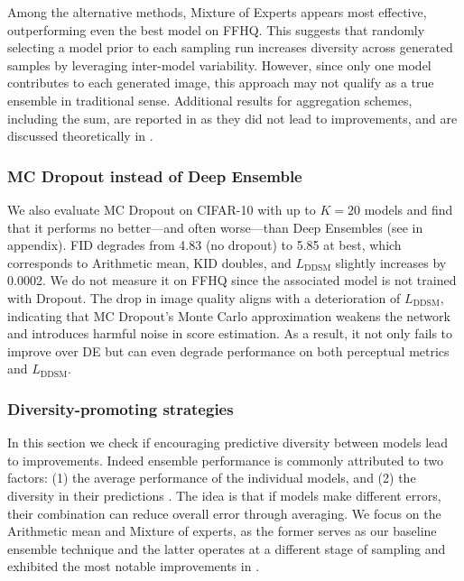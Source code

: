 \documentclass[10pt]{article} %
\newcommand{\DDSM}{\text{DDSM}}
\begin{document}
Among the alternative methods, Mixture of Experts appears most effective, outperforming even the best model on FFHQ. This suggests that randomly selecting a model prior to each sampling run increases diversity across generated samples by leveraging inter-model variability. However, since only one model contributes to each generated image, this approach may not qualify as a true ensemble in traditional sense.
Additional results for aggregation schemes, including the sum, are reported in  as they did not lead to improvements, and are discussed theoretically in  .

\subsubsection{MC Dropout instead of Deep Ensemble}\label{section: MC Dropout}

We also evaluate MC Dropout on CIFAR-10 with up to $K=20$ models and find that it performs no better—and often worse—than Deep Ensembles (see  in appendix). FID degrades from 4.83 (no dropout) to 5.85 at best, which corresponds to Arithmetic mean, KID doubles, and $L_\DDSM$ slightly increases by 0.0002. We do not measure it on FFHQ since the
associated model is not trained with Dropout. 
The drop in image quality aligns with a deterioration of $L_\DDSM$, indicating that MC Dropout’s Monte Carlo approximation weakens the network and introduces harmful noise in score estimation. As a result, it not only fails to improve over DE but can even degrade performance on both perceptual metrics and $L_\DDSM$. 




\subsubsection{Diversity-promoting strategies}\label{section: diversity promoting}

In this section we check if encouraging predictive diversity between models lead to improvements. Indeed ensemble performance is commonly attributed to two factors: (1) the average performance of the individual models, and (2) the diversity in their predictions \citep{breiman1996bagging,breiman2001random,brown2005diversity}. The idea is that if models make different errors, their combination can reduce overall error through averaging. We focus on the Arithmetic mean and Mixture of experts, as the former serves as our baseline ensemble technique and the latter operates at a different stage of sampling and exhibited the most notable improvements in .
\end{document}
